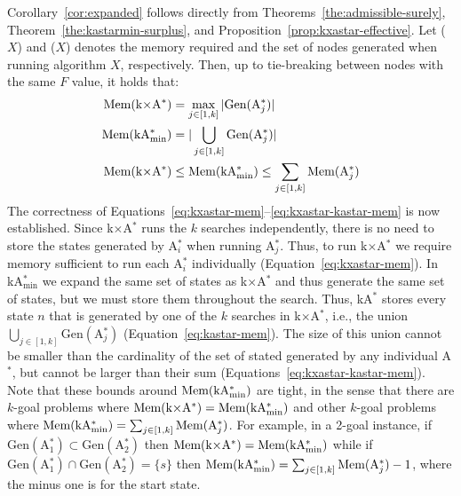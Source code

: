 \documentclass[smallextended]{svjour3}       %
\newcommand{\astar}{A$^*$\xspace}
\newcommand{\kastar}{kA$^*$\xspace}
\newcommand{\kastarvar}[1]{\textup{kA}$^*_{#1}$\xspace}
\newcommand{\kastarmin}{\kastarvar{\min}}
\newcommand{\kxastar}{k$\times$A$^*$\xspace}
\newcommand{\astari}[1]{A$^*_{#1}$\xspace}
\newcommand{\Gen}{\text{Gen}}
\newcommand{\Mem}{\text{Mem}}
\begin{document}
Corollary~\ref{cor:expanded} follows directly from Theorems~\ref{the:admissible-surely}, Theorem~\ref{the:kastarmin-surplus}, and Proposition~\ref{prop:kxastar-effective}. 
Let \Mem($X$) and \Gen($X$) denotes the memory required and the set of nodes generated when running algorithm $X$, respectively. Then, up to tie-breaking between nodes with the same $F$ value, it holds that:
\begin{align}
\Mem(\text{\kxastar})&=\max_{j\in [1,k]}| \Gen(\text{\astari{j}})| \label{eq:kxastar-mem}\\
\Mem(\text{\kastarmin})&=|\bigcup_{j\in [1,k]} \Gen(\text{\astari{j}})| \label{eq:kastar-mem}\\
\Mem(\text{\kxastar})&\leq \Mem(\text{\kastarmin}) \leq \sum_{j\in[1,k]} \Mem(\text{\astari{j}}) \label{eq:kxastar-kastar-mem}
\end{align}
The correctness of Equations~\eqref{eq:kxastar-mem}--\eqref{eq:kxastar-kastar-mem} is now established.
Since \kxastar runs the $k$ searches independently, there is no need to store the states generated by \astari{i} when running \astari{j}.
Thus, to run \kxastar we require memory sufficient to run each \astari{i} individually (Equation~\eqref{eq:kxastar-mem}).
In \kastarmin we expand the same set of states as \kxastar and thus generate the same set of states, but we must store them throughout the search.
Thus, \kastar stores every state $n$ that is  generated by one of the $k$ searches in \kxastar, i.e., the union $\bigcup_{j\in[1,k]}\Gen(\text{\astari{j}})$ (Equation~\eqref{eq:kastar-mem}).
The size of this union cannot be smaller than the cardinality of the set of stated generated by any individual \astar, but cannot be larger than their sum (Equations~\eqref{eq:kxastar-kastar-mem}).
Note that these bounds around $\Mem(\text{\kastarmin})$ 
are tight, in the sense that there are $k$-goal problems where $\Mem(\text{\kxastar}) = \Mem(\text{\kastarmin})$ and other $k$-goal problems where $\Mem(\text{\kastarmin}) = \sum_{j\in[1,k]} \Mem(\text{\astari{j}})$.
For example, in a 2-goal instance, if $\Gen(\text{\astari{1}})\subset \Gen(\text{\astari{2}})$ then $\Mem(\text{\kxastar}) = \Mem(\text{\kastarmin})$ while if $\Gen(\text{\astari{1}})\cap \Gen(\text{\astari{2}})=\{s\}$ then $\Mem(\text{\kastarmin}) = \sum_{j\in[1,k]} \Mem(\text{\astari{j}})-1$, where the minus one is for the start state. %
\end{document}
